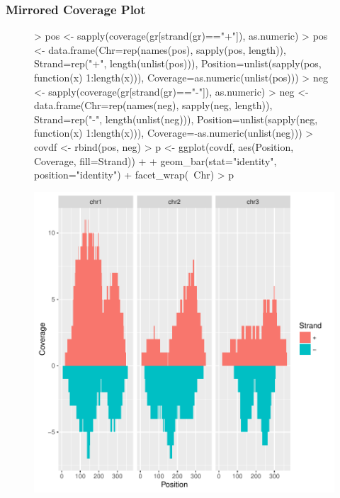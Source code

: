 \documentclass{beamer}
\begin{document}
\begin{frame}[containsverbatim]  
	\frametitle{Mirrored Coverage Plot}
\tiny 
\begin{figure}
  \centering
\begin{Schunk}
\begin{Sinput}
> pos <- sapply(coverage(gr[strand(gr)=="+"]), as.numeric)
> pos <- data.frame(Chr=rep(names(pos), sapply(pos, length)), Strand=rep("+", length(unlist(pos))), Position=unlist(sapply(pos, function(x) 1:length(x))), Coverage=as.numeric(unlist(pos)))
> neg <- sapply(coverage(gr[strand(gr)=="-"]), as.numeric)
> neg <- data.frame(Chr=rep(names(neg), sapply(neg, length)), Strand=rep("-", length(unlist(neg))), Position=unlist(sapply(neg, function(x) 1:length(x))), Coverage=-as.numeric(unlist(neg)))
> covdf <- rbind(pos, neg)
> p <- ggplot(covdf, aes(Position, Coverage, fill=Strand)) + 
+ 	    geom_bar(stat="identity", position="identity") + facet_wrap(~Chr)
> p
\end{Sinput}
\end{Schunk}
\includegraphics{fig--082}
\label{fig:tracks}
\end{figure}
\end{frame}
\end{document}
